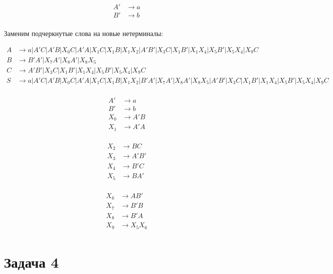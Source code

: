 \documentclass[a4paper]{article}
\begin{document}
\begin{enumerate}
\begin{multicols}{2}
\begin{align*}
		A' &\to a\\
		B' &\to b\\
	\end{align*}	
\end{multicols}
\vspace{-7ex}
Заменим подчеркнутые слова на новые нетерминалы:
\vspace{-6ex}
\begin{multicols}{2}
	\begin{align*}
		A &\to a|A'C|A'B|X_0C|A'A|X_1C|X_1B|X_1X_2|A'B'|X_3C|X_1B'|X_1X_4|X_5B'|X_5X_4|X_9C\\
		B &\to B'A'|X_7A'|X_8A'|X_8X_5\\
		C &\to A'B'|X_3C|X_1B'|X_1X_4|X_5B'|X_5X_4|X_9C\\
		S &\to a|A'C|A'B|X_0C|A'A|X_1C|X_1B|X_1X_2|B'A'|X_7A'|X_8A'|X_8X_5|A'B'|X_3C|X_1B'|X_1X_4|X_5B'|X_5X_4|X_9C\\			
	\end{align*}
\end{multicols}
\vspace{-6ex}
\vspace{-6ex}
\begin{multicols}{3}
	\begin{align*}
		A' &\to a\\
		B' &\to b\\
		X_0 &\to A'B\\
		X_1 &\to A'A\\
	\end{align*}	
	
	\begin{align*}
		X_2 &\to BC\\
		X_3 &\to A'B'\\
		X_4 &\to B'C\\
		X_5 &\to BA'\\		
	\end{align*}	
	
	\begin{align*}
		X_6 &\to AB'\\
		X_7 &\to B'B\\
		X_8 &\to B'A\\
		X_9 &\to X_5X_6\\
	\end{align*}	
\end{multicols}
\vspace{-7ex}
\end{enumerate}
\section*{Задача 4}
\end{document}
